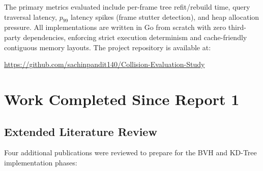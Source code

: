 \documentclass[12pt]{article}
\begin{document}
The primary metrics evaluated include per-frame tree refit/rebuild time, query traversal latency, $p_{99}$ latency spikes (frame stutter detection), and heap allocation pressure. All implementations are written in Go from scratch with zero third-party dependencies, enforcing strict execution determinism and cache-friendly contiguous memory layouts. The project repository is available at:
\begin{center}
    \url{https://github.com/sachinpandit140/Collision-Evaluation-Study}
\end{center}

\section{Work Completed Since Report 1}

\subsection{Extended Literature Review}

Four additional publications were reviewed to prepare for the BVH and KD-Tree implementation phases:
\end{document}
